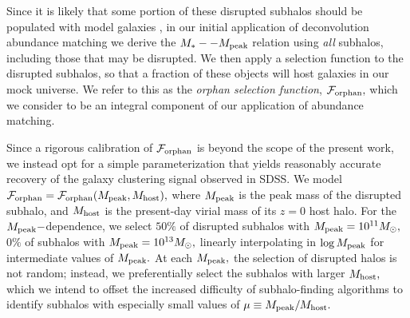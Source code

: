 \documentclass[usenatbib,usegraphicx,letterpaper]{mn2e}
\newcommand{\mstar}{M_{\ast}}
\newcommand{\mpeak}{M_{\rm peak}}
\newcommand{\mhost}{M_{\rm host}}
\newcommand{\msun}{M_\odot}
\begin{document}
Since it is likely that some portion of these disrupted subhalos should be populated with model galaxies \citep{guo_white13, campbell_etal17}, in our initial application of deconvolution abundance matching we derive the $\mstar--\mpeak$ relation using {\em all} subhalos, including those that may be disrupted. We then apply a selection function to the disrupted subhalos, so that a fraction of these objects will host galaxies in our mock universe. We refer to this as the {\em orphan selection function}, $\mathcal{F}_{\rm orphan},$ which we consider to be an integral component of our application of abundance matching.

Since a rigorous calibration of $\mathcal{F}_{\rm orphan}$ is beyond the scope of the present work, we instead opt for a simple parameterization that yields reasonably accurate recovery of the galaxy clustering signal observed in SDSS. We model $\mathcal{F}_{\rm orphan}=\mathcal{F}_{\rm orphan}(M_{\rm peak},M_{\rm host}),$ where $\mpeak$ is the peak mass of the disrupted subhalo, and $\mhost$ is the present-day virial mass of its $z=0$ host halo. For the $\mpeak-$dependence, we select $50\%$ of disrupted subhalos with $\mpeak=10^{11}\msun,$ $0\%$ of subhalos with $\mpeak=10^{13}\msun,$ linearly interpolating in $\log\mpeak$ for intermediate values of $\mpeak.$ At each $\mpeak,$ the selection of disrupted halos is not random; instead, we preferentially select the subhalos with larger $\mhost,$ which we intend to offset the increased difficulty of subhalo-finding algorithms to identify subhalos with especially small values of  $\mu\equiv\mpeak/\mhost.$
\end{document}
